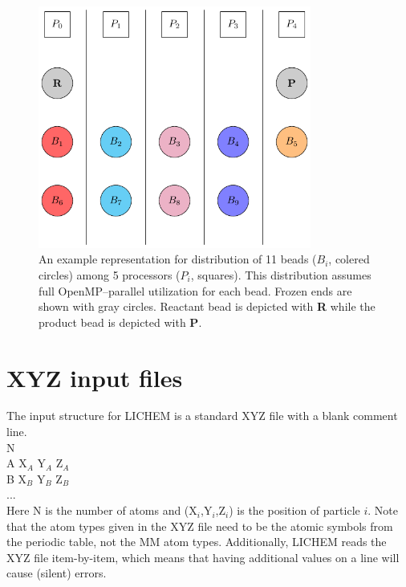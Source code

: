 \documentclass[12pt]{report}
\begin{document}
\begin{center}
\begin{figure}[!ht]
\centering
\includegraphics[width=0.8\textwidth]{../doc/images/load_balance.pdf}
\caption{An example representation for distribution of 11 beads
($B_i$, colered circles) among 5 processors ($P_i$, squares).
This distribution assumes full OpenMP--parallel utilization for each
bead.
Frozen ends are shown with gray circles. Reactant bead is depicted with
\textbf{R} while the product bead is depicted with \textbf{P}.}
\label{fig:loadbalance}
\end{figure}
\end{center}

\section{XYZ input files}

The input structure for LICHEM is a standard XYZ file with a blank comment
line. \\

N \\

A  X$_A$  Y$_A$  Z$_A$ \\
B  X$_B$  Y$_B$  Z$_B$ \\
... \\

Here N is the number of atoms and (X$_i$,Y$_i$,Z$_i$) is the position of
particle $i$.
Note that the atom types given in the XYZ file need to be the atomic symbols
from the periodic table, not the MM atom types.
Additionally, LICHEM reads the XYZ file item-by-item, which means that having
additional values on a line will cause (silent) errors.
\end{document}
